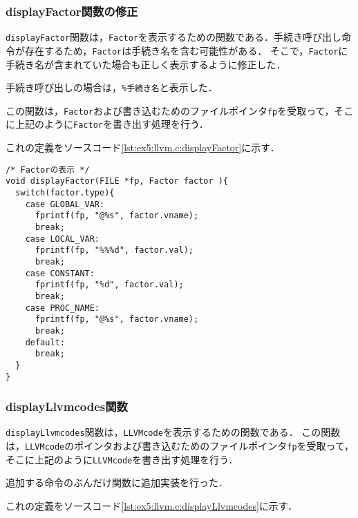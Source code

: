 \documentclass[uplatex]{jsarticle}
\begin{document}
\subsubsection{displayFactor関数の修正}
\verb#displayFactor#関数は，\verb#Factor#を表示するための関数である．手続き呼び出し命令が存在するため，\verb#Factor#は手続き名を含む可能性がある．
そこで，\verb#Factor#に手続き名が含まれていた場合も正しく表示するように修正した．

手続き呼び出しの場合は，\verb#%手続き名#と表示した．

この関数は，\verb#Factor#および書き込むためのファイルポインタ\verb#fp#を受取って，そこに上記のように\verb#Factor#を書き出す処理を行う．

これの定義をソースコード\ref{lst:ex5:llvm.c:displayFactor}に示す．
\begin{lstlisting}[caption=displayFactor関数の定義,label=lst:ex5:llvm.c:displayFactor]
/* Factorの表示 */
void displayFactor(FILE *fp, Factor factor ){
  switch(factor.type){
    case GLOBAL_VAR:
      fprintf(fp, "@%s", factor.vname);
      break;
    case LOCAL_VAR:
      fprintf(fp, "%%%d", factor.val);
      break;
    case CONSTANT:
      fprintf(fp, "%d", factor.val);
      break;
    case PROC_NAME:
      fprintf(fp, "@%s", factor.vname);
      break;
    default:
      break;
  }
}
\end{lstlisting}


\subsubsection{displayLlvmcodes関数}
\verb#displayLlvmcodes#関数は，\verb#LLVMcode#を表示するための関数である．
この関数は，\verb#LLVMcode#のポインタおよび書き込むためのファイルポインタ\verb#fp#を受取って，そこに上記のように\verb#LLVMcode#を書き出す処理を行う．

追加する命令のぶんだけ関数に追加実装を行った．

これの定義をソースコード\ref{lst:ex5:llvm.c:displayLlvmcodes}に示す．
\end{document}
